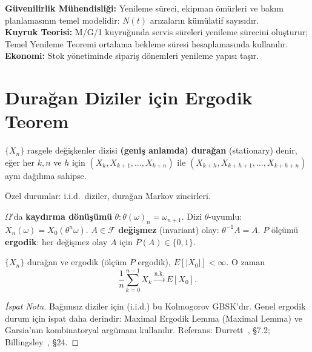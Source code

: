 \begin{disiplinlerarasibaglan}
\textbf{Güvenilirlik Mühendisliği:} Yenileme süreci, ekipman ömürleri ve
bakım planlamasının temel modelidir: $N(t)$ arızaların kümülatif sayısıdır.\\
\textbf{Kuyruk Teorisi:} M/G/1 kuyruğunda servis süreleri yenileme sürecini oluşturur;
Temel Yenileme Teoremi ortalama bekleme süresi hesaplamasında kullanılır.\\
\textbf{Ekonomi:} Stok yönetiminde sipariş dönemleri yenileme yapısı taşır.
\end{disiplinlerarasibaglan}

\section{Durağan Diziler için Ergodik Teorem}
\label{sec:ergodik_teorem}

\begin{tanim}
\label{def:duragan_dizi}
$\{X_n\}$ rasgele değişkenler dizisi \textbf{(geniş anlamda) durağan}
(stationary) denir, eğer her $k, n$ ve $h$ için
$(X_k, X_{k+1}, \ldots, X_{k+n})$ ile $(X_{k+h}, X_{k+h+1}, \ldots, X_{k+h+n})$
aynı dağılıma sahipse.

Özel durumlar: i.i.d.\ diziler, durağan Markov zincirleri.
\end{tanim}

\begin{tanim}
\label{def:ergodiklik}
$\Omega$'da \textbf{kaydırma dönüşümü} $\theta: \theta(\omega)_n = \omega_{n+1}$.
Dizi $\theta$-uyumlu: $X_n(\omega) = X_0(\theta^n \omega)$.
$A \in \mathcal{F}$ \textbf{değişmez} (invariant) olay: $\theta^{-1}A = A$.
$P$ ölçümü \textbf{ergodik}: her değişmez olay $A$ için $P(A) \in \{0,1\}$.
\end{tanim}

\begin{teorem}
\label{thm:birkhoff}
$\{X_n\}$ durağan ve ergodik (ölçüm $P$ ergodik), $E[|X_0|] < \infty$. O zaman
\[
  \frac{1}{n}\sum_{k=0}^{n-1} X_k \xrightarrow{\text{n.k.}} E[X_0].
\]
\end{teorem}

\begin{proof}[İspat Notu]
Bağımsız diziler için (i.i.d.) bu Kolmogorov GBSK'dır.
Genel ergodik durum için ispat daha derindir: Maximal Ergodik Lemma (Maximal Lemma)
ve Garsia'nın kombinatoryal argümanı kullanılır.
Referans: Durrett~\cite{Durrett2019}, §7.2; Billingsley~\cite{Billingsley1995}, §24.
\end{proof}


